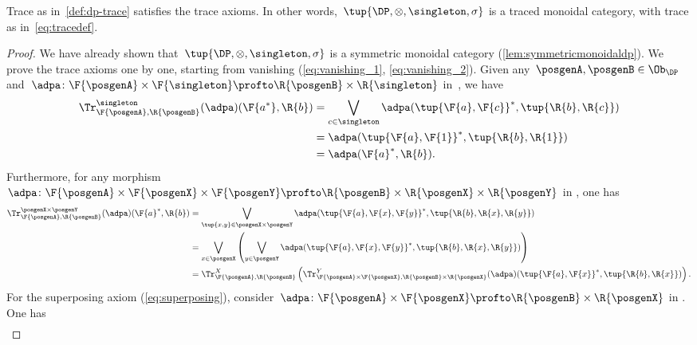\begin{lemma}
    Trace as in~\cref{def:dp-trace} satisfies the trace axioms.
    In other words,~$\tup{\DP, \otimes, \singleton, \sigma}$ is a traced monoidal category, with trace as in~\cref{eq:tracedef}.
\end{lemma}
\begin{proof}
    We have already shown that~$\tup{\DP,\otimes,\singleton,\sigma}$ is a symmetric monoidal category (\cref{lem:symmetricmonoidaldp}).
    We prove the trace axioms one by one, starting from vanishing (\cref{eq:vanishing_1}, \cref{eq:vanishing_2}).
    Given any~$\posgenA,\posgenB\in \Ob_\DP$ and~$\adpa\colon \F{\posgenA}\times \F{\singleton}\profto \R{\posgenB}\times \R{\singleton}$ in~\DP, we have
    \begin{equation}
        \begin{aligned}
            \Tr_{\F{\posgenA},\R{\posgenB}}^{\singleton}(\adpa)(\F{a^*},\R{b})&=\bigvee_{c\in \singleton}\adpa(\tup{\F{a},\F{c}}^*,\tup{\R{b},\R{c}})\\
            &=\adpa(\tup{\F{a},\F{1}}^*,\tup{\R{b},\R{1}})\\
            &=\adpa(\F{a}^*,\R{b}).
        \end{aligned}
    \end{equation}
    Furthermore, for any morphism~$\adpa\colon \F{\posgenA}\times \F{\posgenX}\times \F{\posgenY} \profto \R{\posgenB}\times \R{\posgenX} \times \R{\posgenY}$ in \DP, one has
    \begin{equation}
        \begin{aligned}
            \Tr_{\F{\posgenA},\R{\posgenB}}^{\posgenX\times \posgenY}(\adpa)(\F{a}^*,\R{b})&=\bigvee_{\tup{x,y} \in \posgenX\times \posgenY} \adpa(\tup{\F{a},\F{x},\F{y}}^*,\tup{\R{b},\R{x},\R{y}})\\
            &=\bigvee_{x \in \posgenX}\left(\bigvee_{y \in \posgenY} \adpa(\tup{\F{a},\F{x},\F{y}}^*,\tup{\R{b},\R{x},\R{y}})\right)\\
            &=\Tr_{\F{\posgenA},\R{\posgenB}}^X\left(
            \Tr_{\F{\posgenA}\times \F{\posgenX},\R{\posgenB}\times \R{\posgenX}}^Y(\adpa)(\tup{\F{a},\F{x}}^*,\tup{\R{b},\R{x}})\right).
        \end{aligned}
    \end{equation}
    For the superposing axiom (\cref{eq:superposing}), consider~$\adpa\colon \F{\posgenA}\times \F{\posgenX}\profto \R{\posgenB}\times \R{\posgenX}$ in \DP.
    One has
    \begin{equation}
        \begin{aligned}

\end{aligned}
\end{equation}
\end{proof}
